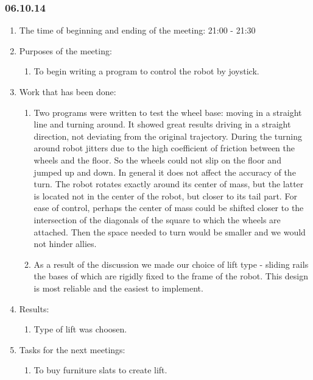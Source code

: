 \textsl{}
\subsubsection{06.10.14}

\begin{enumerate}
	\item The time of beginning and ending of the meeting:
	21:00 - 21:30
	\item Purposes of the meeting:
	\begin{enumerate}
	  \item To begin writing a program to control the robot by joystick.
	  
    \end{enumerate}
	\item Work that has been done:
	\begin{enumerate}
	  \item Two programs were written to test the wheel base: moving in a straight line and turning around. It showed great results driving in a straight direction, not deviating from the original trajectory. During the turning around robot jitters due to the high coefficient of friction between the wheels and the floor. So the wheels could not slip on the floor and jumped up and down. In general it does not affect the accuracy of the turn. The robot rotates exactly around its center of mass, but the latter is located not in the center of the robot, but closer to its tail part. For ease of control, perhaps the center of mass could be shifted closer to the intersection of the diagonals of the square to which the wheels are attached. Then the space needed to turn would be smaller and we would not hinder allies. 
      
      \item  As a result of the discussion we made our choice of lift type - sliding rails the bases of which are rigidly fixed to the frame of the robot. This design is most reliable and the easiest to implement.
      
    \end{enumerate}
    
	\item Results: 
	\begin{enumerate}
      \item  Type of lift was choosen.

    \end{enumerate}
    
	\item Tasks for the next meetings:
	\begin{enumerate}
	  \item To buy furniture slats to create lift.

    \end{enumerate}     
\end{enumerate}
\fillpage
